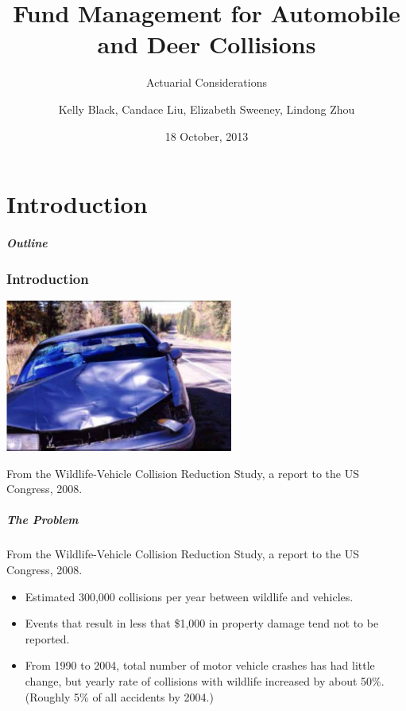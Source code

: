 \documentclass{beamer}   %
\begin{document}
\part{Introduction}


\title{Fund Management for Automobile and Deer Collisions}
\subtitle{Actuarial Considerations}

\author{Kelly Black, Candace Liu, Elizabeth Sweeney, Lindong Zhou}
\date{18 October, 2013}

\begin{frame}[plain]
  \titlepage
\end{frame}

\begin{frame}
  \frametitle{Outline}
  \vspace{-5mm}
  \tableofcontents[]
\end{frame}

\section{Introduction}

\begin{frame}
  \begin{center}
    \includegraphics[height=5cm]{propertyCongressionalStudy}
  \end{center}
  From the Wildlife-Vehicle Collision Reduction Study, a report to the
  US Congress, 2008.
\end{frame}

\begin{frame}
  \frametitle{The Problem}

  From the Wildlife-Vehicle Collision Reduction Study, a report to the
  US Congress, 2008.
  \begin{itemize}
  \item Estimated 300,000 collisions per year between wildlife and
    vehicles.
  \item Events that result in less that \$1,000 in property damage
    tend not to be reported.
  \item From 1990 to 2004, total number of motor vehicle crashes has
    had little change, but yearly rate of collisions with wildlife
    increased by about 50\%. (Roughly 5\% of all accidents by 2004.)
  \end{itemize}
  
\end{frame}
\end{document}
